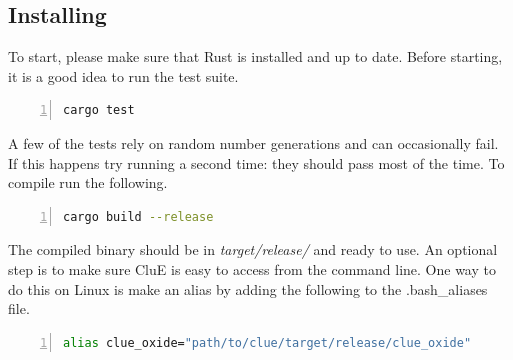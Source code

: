 \documentclass{book}
\begin{document}
\subsection{Installing}
To start, please make sure that Rust is installed and up to date\cite{rust}.
Before starting, it is a good idea to run the test suite.
\begin{lstlisting}[frame=single,numbers=left,language=bash]
cargo test
\end{lstlisting}
A few of the tests rely on random number generations and can occasionally fail.
If this happens try running a second time: they should pass most of the time.
To compile run the following.
\begin{lstlisting}[frame=single,numbers=left,language=bash]
cargo build --release
\end{lstlisting}
The compiled binary should be in \textit{target/release/} and ready to use.
An optional step is to make sure CluE is easy to access from the command line.
One way to do this on Linux is make an alias by adding the following to 
the .bash\_aliases file.
\begin{lstlisting}[frame=single,numbers=left,language=bash]
alias clue_oxide="path/to/clue/target/release/clue_oxide"
\end{lstlisting}

\end{document}
